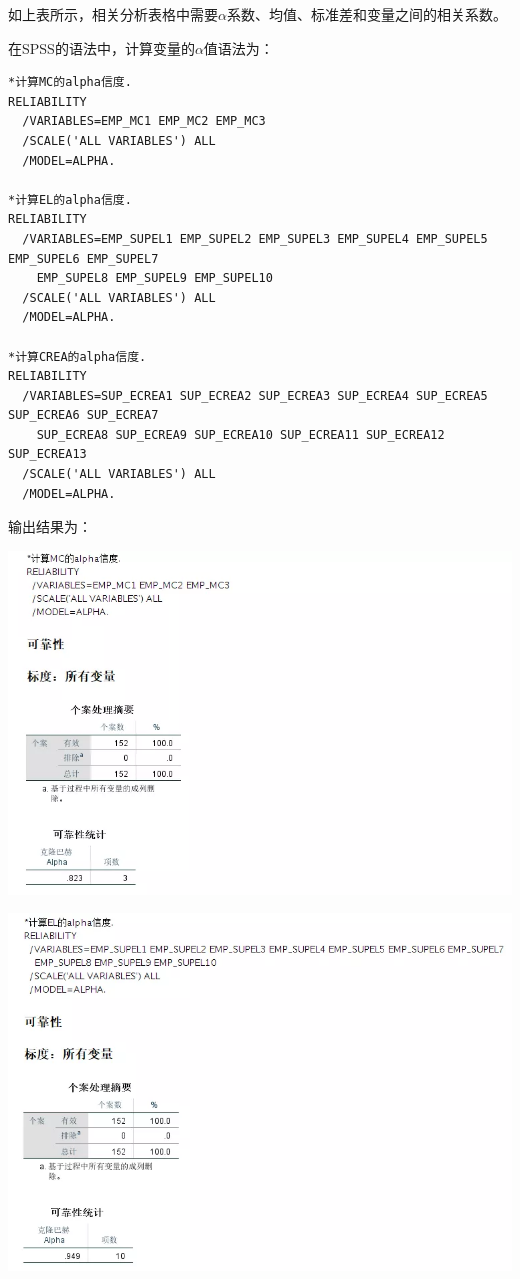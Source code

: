\documentclass[
]{book}
\begin{document}
如上表所示，相关分析表格中需要\(\alpha\)系数、均值、标准差和变量之间的相关系数。

在SPSS的语法中，计算变量的\(\alpha\)值语法为：

\begin{verbatim}
*计算MC的alpha信度.
RELIABILITY
  /VARIABLES=EMP_MC1 EMP_MC2 EMP_MC3
  /SCALE('ALL VARIABLES') ALL
  /MODEL=ALPHA.

*计算EL的alpha信度.
RELIABILITY
  /VARIABLES=EMP_SUPEL1 EMP_SUPEL2 EMP_SUPEL3 EMP_SUPEL4 EMP_SUPEL5 EMP_SUPEL6 EMP_SUPEL7 
    EMP_SUPEL8 EMP_SUPEL9 EMP_SUPEL10
  /SCALE('ALL VARIABLES') ALL
  /MODEL=ALPHA.

*计算CREA的alpha信度.
RELIABILITY
  /VARIABLES=SUP_ECREA1 SUP_ECREA2 SUP_ECREA3 SUP_ECREA4 SUP_ECREA5 SUP_ECREA6 SUP_ECREA7 
    SUP_ECREA8 SUP_ECREA9 SUP_ECREA10 SUP_ECREA11 SUP_ECREA12 SUP_ECREA13
  /SCALE('ALL VARIABLES') ALL
  /MODEL=ALPHA.
\end{verbatim}

输出结果为：

\includegraphics{figs/1312.png}

\includegraphics{figs/1313.png}
\end{document}
